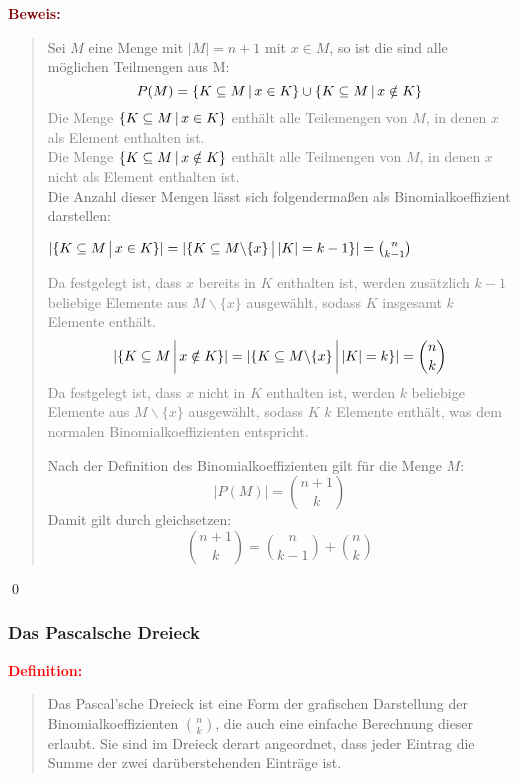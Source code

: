 \documentclass{article}
\newcommand{\smsp}{\phantom{\hspace{3px}}}
\newcommand{\red}[1]{\textcolor{red}{#1}}
\newcommand{\gray}[1]{\textcolor{gray}{#1}}
\newcommand{\maroon}[1]{\textcolor{maroon}{#1}}
\newcommand{\de}[1]{\red{\textbf{Definition: }}\begin{quote}#1\end{quote}}
\newcommand{\pr}[1]{\maroon{\textbf{Beweis: }}\begin{quote}#1\end{quote}\qed}
\newcommand{\vst}{\smsp \vline \smsp}
\newcommand{\bs}{\backslash}
\begin{document}
\pr{
    Sei $M$ eine Menge mit $|M| = n + 1$ mit $x \in M$, so ist die sind alle möglichen Teilmengen aus M:
    \begin{equation*}
        P(M) = \{K \subseteq M \vst x \in K\} \cup \{K \subseteq M \vst x \notin K\}
    \end{equation*}
    \gray{Die Menge $\{K \subseteq M \vst x \in K\}$ enthält alle Teilemengen von $M$, in denen $x$ als Element enthalten ist.\\ Die Menge $\{K \subseteq M \vst x \notin K\}$ enthält alle Teilmengen von $M$, in denen $x$ nicht als Element enthalten ist.}\\
    Die Anzahl dieser Mengen lässt sich folgendermaßen als Binomialkoeffizient darstellen:
    \begin{center}
        $|\{K \subseteq M \vst x \in K\}| = |\{K \subseteq M \bs \{x\} \vst |K| = k - 1\}| = \binom{n}{k - 1}$
    \end{center}
    \gray{Da festgelegt ist, dass $x$ bereits in $K$ enthalten ist, werden zusätzlich $k - 1$ beliebige Elemente aus $M \bs \{x\}$ ausgewählt, sodass $K$ insgesamt $k$ Elemente enthält.}
    \begin{equation*}
        |\{K \subseteq M \vst x \notin K\}| = |\{K \subseteq M \bs \{x\} \vst |K| = k\}| = \binom{n}{k}
    \end{equation*}
    \gray{Da festgelegt ist, dass $x$ nicht in $K$ enthalten ist, werden $k$ beliebige Elemente aus $M \bs \{x\}$ ausgewählt, sodass $K$ $k$ Elemente enthält, was dem normalen Binomialkoeffizienten entspricht.}

    Nach der Definition des Binomialkoeffizienten gilt für die Menge $M$:
    \begin{equation*}
        |P(M)| = \binom{n + 1}{k} 
    \end{equation*}
    Damit gilt durch gleichsetzen:
    \begin{equation*}
        \binom{n + 1}{k} = \binom{n}{k - 1} + \binom{n}{k}
    \end{equation*}
}

\newpage

\subsubsection{Das Pascalsche Dreieck}

\de{Das Pascal'sche Dreieck ist eine Form der grafischen Darstellung der Binomialkoeffizienten $\binom{n}{k}$, die auch eine einfache Berechnung dieser erlaubt. Sie sind im Dreieck derart angeordnet, dass jeder Eintrag die Summe der zwei darüberstehenden Einträge ist.}
\end{document}
